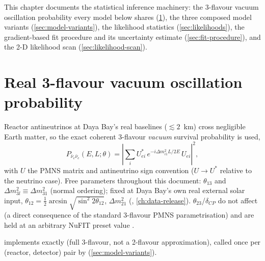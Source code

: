 \label{ch:inference-process}

This chapter documents the statistical inference machinery: the 3-flavour
vacuum oscillation probability every model below shares
(\cref{sec:oscillation-probability}), the three composed model variants
(\cref{sec:model-variants}), the likelihood statistics
(\cref{sec:likelihoods}), the gradient-based fit procedure and its
uncertainty estimate (\cref{sec:fit-procedure}), and the 2-D likelihood
scan (\cref{sec:likelihood-scan}).

\section{Real 3-flavour vacuum oscillation probability}
\label{sec:oscillation-probability}


\begin{theorybox}
Reactor antineutrinos at Daya Bay's real baselines ($\lesssim2$~km) cross
negligible Earth matter, so the exact coherent 3-flavour \emph{vacuum}
survival probability is used,
\begin{equation}
  P_{\bar\nu_e\bar\nu_e}(E,L;\theta) = \left|\sum_i U_{ei}^{*}\,
    e^{-i\Delta m^2_{i1}L/2E}\,U_{ei}\right|^2,
  \label{eq:vacuum-survival}
\end{equation}
with $U$ the PMNS matrix \parencite{Pontecorvo1957,MakiNakagawaSakata1962}
and antineutrino sign convention ($U\to U^*$ relative to the neutrino
case). Free parameters throughout this document: $\theta_{13}$ and $\Delta
m^2_{3l}\equiv\Delta m^2_{31}$ (normal ordering); fixed at Daya Bay's own
real external solar input, $\theta_{12}=\tfrac12\arcsin\sqrt{\sin^2
2\theta_{12}}$, $\Delta m^2_{21}$ (,
\cref{ch:data-release}). $\theta_{23}$/$\delta_{CP}$ do not affect
 (a direct consequence of the standard
3-flavour PMNS parametrisation) and are held at an arbitrary NuFIT preset
value \parencite{EstebanNuFit2024}.
\end{theorybox}

\begin{implbox}
implements  exactly (full 3-flavour, not a
2-flavour approximation), called once per (reactor, detector) pair by
 (\cref{sec:model-variants}).
\end{implbox}

